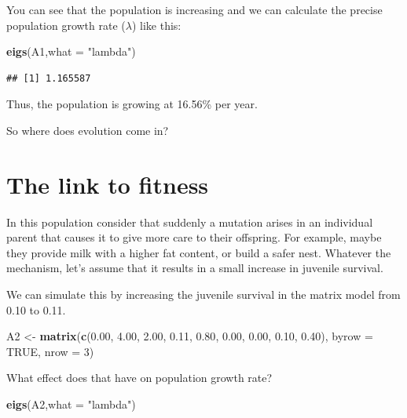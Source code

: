 \documentclass[
  a4paper]{book}
\newenvironment{Shaded}{\begin{snugshade}}{\end{snugshade}}
\newcommand{\AttributeTok}[1]{\textcolor[rgb]{0.13,0.29,0.53}{#1}}
\newcommand{\ConstantTok}[1]{\textcolor[rgb]{0.56,0.35,0.01}{#1}}
\newcommand{\DecValTok}[1]{\textcolor[rgb]{0.00,0.00,0.81}{#1}}
\newcommand{\FloatTok}[1]{\textcolor[rgb]{0.00,0.00,0.81}{#1}}
\newcommand{\FunctionTok}[1]{\textcolor[rgb]{0.13,0.29,0.53}{\textbf{#1}}}
\newcommand{\NormalTok}[1]{#1}
\newcommand{\OtherTok}[1]{\textcolor[rgb]{0.56,0.35,0.01}{#1}}
\newcommand{\StringTok}[1]{\textcolor[rgb]{0.31,0.60,0.02}{#1}}
\begin{document}
You can see that the population is increasing and we can calculate the precise population growth rate (\(\lambda\)) like this:

\begin{Shaded}
\begin{Highlighting}[]
\FunctionTok{eigs}\NormalTok{(A1,}\AttributeTok{what =} \StringTok{"lambda"}\NormalTok{)}
\end{Highlighting}
\end{Shaded}

\begin{verbatim}
## [1] 1.165587
\end{verbatim}

Thus, the population is growing at 16.56\% per year.

So where does evolution come in?

\section{The link to fitness}\label{the-link-to-fitness}

In this population consider that suddenly a mutation arises in an individual parent that causes it to give more care to their offspring. For example, maybe they provide milk with a higher fat content, or build a safer nest. Whatever the mechanism, let's assume that it results in a small increase in juvenile survival.

We can simulate this by increasing the juvenile survival in the matrix model from 0.10 to 0.11.

\begin{Shaded}
\begin{Highlighting}[]
\NormalTok{A2 }\OtherTok{\textless{}{-}} \FunctionTok{matrix}\NormalTok{(}\FunctionTok{c}\NormalTok{(}\FloatTok{0.00}\NormalTok{, }\FloatTok{4.00}\NormalTok{, }\FloatTok{2.00}\NormalTok{, }
               \FloatTok{0.11}\NormalTok{, }\FloatTok{0.80}\NormalTok{, }\FloatTok{0.00}\NormalTok{, }
               \FloatTok{0.00}\NormalTok{, }\FloatTok{0.10}\NormalTok{, }\FloatTok{0.40}\NormalTok{), }
            \AttributeTok{byrow =} \ConstantTok{TRUE}\NormalTok{, }\AttributeTok{nrow =} \DecValTok{3}\NormalTok{)}
\end{Highlighting}
\end{Shaded}

What effect does that have on population growth rate?

\begin{Shaded}
\begin{Highlighting}[]
\FunctionTok{eigs}\NormalTok{(A2,}\AttributeTok{what =} \StringTok{"lambda"}\NormalTok{)}
\end{Highlighting}
\end{Shaded}
\end{document}
